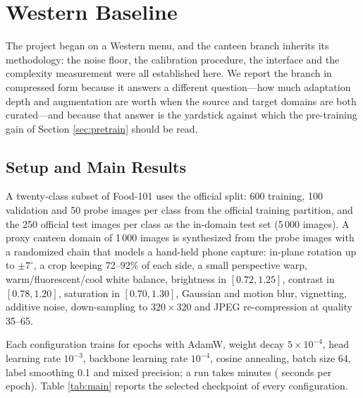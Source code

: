 \section{Western Baseline}
\label{sec:baseline}
The project began on a Western menu, and the canteen branch inherits its
methodology: the noise floor, the calibration procedure, the interface and the
complexity measurement were all established here. We report the branch in
compressed form because it answers a different question---how much adaptation
depth and augmentation are worth when the source and target domains are both
curated---and because that answer is the yardstick against which the
pre-training gain of Section \ref{sec:pretrain} should be read.

\subsection{Setup and Main Results}
A twenty-class subset of Food-101 \cite{bossard2014food101} uses the official
split: 600 training, 100 validation and 50 probe images per class from the
official training partition, and the 250 official test images per class as the
in-domain test set (5\,000 images). A proxy canteen domain of 1\,000 images is
synthesized from the probe images with a randomized chain that models a hand-held
phone capture: in-plane rotation up to $\pm7^\circ$, a crop keeping 72--92\% of
each side, a small perspective warp, warm/fluorescent/cool white balance,
brightness in $[0.72,1.25]$, contrast in $[0.78,1.20]$, saturation in
$[0.70,1.30]$, Gaussian and motion blur, vignetting, additive noise,
down-sampling to $320\times320$ and JPEG re-compression at quality 35--65.

Each configuration trains for \epochsFour{} epochs with AdamW, weight decay
$5\times10^{-4}$, head learning rate $10^{-3}$, backbone learning rate
$10^{-4}$, cosine annealing, batch size 64, label smoothing 0.1 and mixed
precision; a run takes \trainTimeFour{} minutes (\epochSecFour{} seconds per
epoch). Table \ref{tab:main} reports the selected checkpoint of every
configuration.

